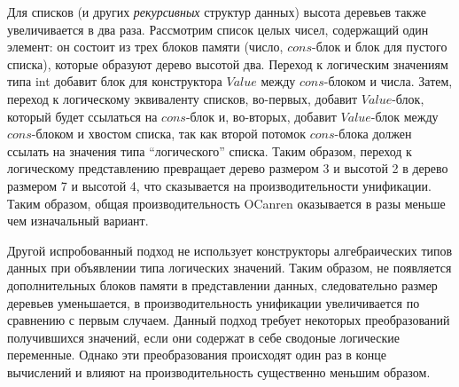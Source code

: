 \documentclass[10pt]{article}
\begin{document}
Для списков (и других \emph{рекурсивных} структур данных) высота деревьев также увеличивается в два раза. Рассмотрим
список целых чисел, содержащий один элемент: он состоит из трех блоков памяти (число, $cons$-блок и блок для пустого списка),
которые образуют дерево высотой два. Переход к логическим значениям типа int добавит блок для конструктора $Value$
между $cons$-блоком и числа. Затем, переход к логическому эквиваленту списков, во-первых, добавит $Value$-блок, который будет
ссылаться на $cons$-блок и, во-вторых, добавит $Value$-блок между $cons$-блоком и хвостом списка, так как второй потомок
$cons$-блока должен ссылать на значения типа ``логического'' списка. Таким образом, переход к логическому представлению
превращает дерево размером 3 и высотой 2 в дерево размером 7 и высотой 4, что сказывается на производительности унификации.
Таким образом, общая производительность OCanren оказывается в разы меньше чем изначальный вариант.

Другой испробованный подход не использует конструкторы алгебраических типов данных при объявлении типа логических значений.
Таким образом, не появляется дополнительных блоков памяти в представлении данных, следовательно размер деревьев уменьшается,
в производительность унификации увеличивается по сравнению с первым случаем. Данный подход требует некоторых
преобразований получившихся значений, если они содержат в себе сводоные логические переменные. Однако эти преобразования
происходят один раз в конце вычислений и влияют на производительность существенно меньшим образом.



\end{document}
